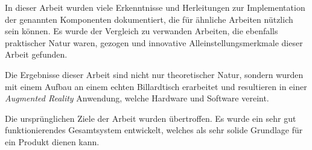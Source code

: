 In dieser Arbeit wurden viele Erkenntnisse und Herleitungen zur Implementation der genannten Komponenten dokumentiert, die für ähnliche Arbeiten nützlich sein können.
Es wurde der Vergleich zu verwanden Arbeiten, die ebenfalls praktischer Natur waren, gezogen und innovative Alleinstellungsmerkmale dieser Arbeit gefunden.

Die Ergebnisse dieser Arbeit sind nicht nur theoretischer Natur, sondern wurden mit einem Aufbau an einem echten Billardtisch
erarbeitet und resultieren in einer \emph{Augmented Reality} Anwendung, welche Hardware und Software vereint.

Die ursprünglichen Ziele der Arbeit wurden übertroffen.
Es wurde ein sehr gut funktionierendes Gesamtsystem entwickelt, welches als sehr solide Grundlage für ein Produkt dienen kann.
